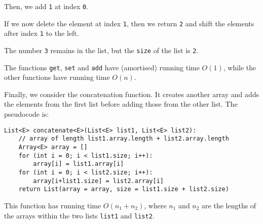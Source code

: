 \documentclass[a4paper, openany]{memoir}
\begin{document}
Then, we add \texttt{1} at index \texttt{0}.
\begin{center}
\end{center}
If we now delete the element at index \texttt{1}, then we return \texttt{2} and shift the elements after index \texttt{1} to the left.
\begin{center}
\end{center}
The number \texttt{3} remains in the list, but the \texttt{size} of the list is \texttt{2}.

\noindent The functions \texttt{get}, \texttt{set} and \texttt{add} have (amortised) running time $O(1)$, while the other functions have running time $O(n)$.

\noindent Finally, we consider the concatenation function. It creates another array and adds the elements from the first list before adding those from the other list. The pseudocode is:
\begin{lstlisting}[language=pseudocode]
List<E> concatenate<E>(List<E> list1, List<E> list2):
    // array of length list1.array.length + list2.array.length
    Array<E> array = []
    for (int i = 0; i < list1.size; i++):
        array[i] = list1.array[i]
    for (int i = 0; i < list2.size; i++):
        array[i+list1.size] = list2.array[i]
    return List(array = array, size = list1.size + list2.size)
\end{lstlisting}
This function has running time $O(n_1 + n_2)$, where $n_1$ and $n_2$ are the lengths of the arrays within the two lists \texttt{list1} and \texttt{list2}.
\end{document}
